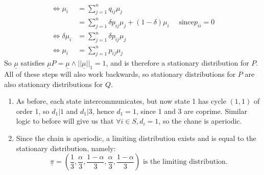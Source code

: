 \documentclass{article}
\begin{document}
\begin{enumerate}
\begin{enumerate}
\begin{align*}
\iff \mu_i &= \sum^n_{j=1}q_{ij}\mu_j\\
&= \sum^n_{j=1}\delta p_{ij}\mu_j + (1-\delta)\mu_i \quad \mbox{ since
$p_{ii}=0$}\\
\iff \delta \mu_i &= \sum^n_{j=1}\delta p_{ij} \mu_j\\
\iff \mu_i &= \sum^n_{j=1}p_{ij}\mu_j
\end{align*}
So $\underline{\mu}$ satisfies $\underline{\mu}P = \underline{\mu} \wedge
||\underline{\mu}||_1 = 1$, and is therefore a stationary distribution for $P$.
All of these steps will also work backwards, so stationary distributions for $P$
are also stationary distributions for $Q$.
\begin{enumerate}
\item
As before, each state intercommunicates, but now state 1 has cycle $(1,1)$ of
order 1, so $d_1|1$ and $d_1 | 3$, hence $d_1 =1$, since 1 and 3 are coprime.
Similar logic to before will give us that $\forall i \in S, d_i = 1$, so the
chane is aperiodic.
\item
Since the chain is aperiodic, a limiting distribution exists and is equal to the 
stationary distribution, namely:
$$
\underline{\pi} =
\left(\frac{1}{3},\frac{\alpha}{3},\frac{1-\alpha}{3},\frac{\alpha}{3},\frac{1-\alpha}{3}\right)
\mbox{ is the limiting distribution.}
$$
\end{enumerate}

\end{enumerate}
\end{enumerate}
\end{document}
